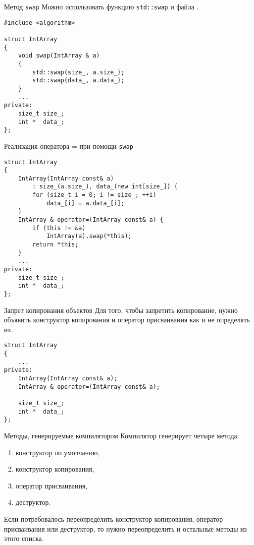 \documentclass{beamer}
\begin{document}
\begin{frame}[fragile]{Метод {\tt swap}}{}
Можно использовать функцию {\tt std::swap} и файла .
\begin{lstlisting}
#include <algorithm>

struct IntArray 
{
    void swap(IntArray & a) 
    {
        std::swap(size_, a.size_);
        std::swap(data_, a.data_);
    }
    ...
private:
    size_t size_;
    int *  data_;
};
\end{lstlisting}
\end{frame}

\begin{frame}[fragile]{Реализация оператора = при помощи {\tt swap}}{}
\begin{lstlisting}
struct IntArray 
{
    IntArray(IntArray const& a) 
        : size_(a.size_), data_(new int[size_]) {
        for (size_t i = 0; i != size_; ++i)
            data_[i] = a.data_[i];    
    }
    IntArray & operator=(IntArray const& a) {
        if (this != &a)
            IntArray(a).swap(*this);
        return *this;
    }
    ...
private:
    size_t size_;
    int *  data_;
};
\end{lstlisting}
\end{frame}

\begin{frame}[fragile]{Запрет копирования объектов}{}
    Для того, чтобы запретить копирование, нужно объявить конструктор копирования
    и оператор присваивания как  и не определять их.
\begin{lstlisting}
struct IntArray 
{
    ...
private:
    IntArray(IntArray const& a);
    IntArray & operator=(IntArray const& a);

    size_t size_;
    int *  data_;
};
\end{lstlisting}
\end{frame}

\begin{frame}[fragile]{Методы, генерируемые компилятором}{}
    Компилятор генерирует четыре метода:
    \begin{enumerate}
        \item конструктор по умолчанию,
        \item конструктор копирования,
        \item оператор присваивания,
        \item деструктор.
    \end{enumerate}

    Если потребовалось переопределить конструктор копирования,
    оператор присваивания или деструктор, то нужно 
    переопределить и остальные методы из этого списка. 
\end{frame}
\end{document}
